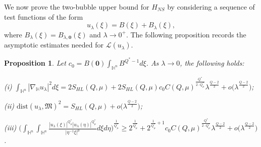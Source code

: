 \documentclass[11pt]{article}
\newtheorem{proposition}{Proposition}[section]
\begin{document}
{We now prove the two-bubble upper bound for $H_{NS}$ by considering a sequence of test}
functions of the form
\begin{equation*}
 u_\lambda(\xi)=B(\xi)+B_\lambda(\xi),
\end{equation*}
where $B_\lambda(\xi)=B_{\lambda,\mathbf{0}}(\xi)$ and $\lambda\rightarrow 0^+$. {The following proposition records the asymptotic estimates needed for $\mathcal{L}(u_\lambda)$.}
\begin{proposition}\label{p4.1}
Let $c_0=B(\mathbf{0})\int_{\mathbb{H}^{n}} B^{Q^{\ast}-1}d\xi$.
As $\lambda\rightarrow0$, the following holds:

(i) $\int_{\mathbb{H}^{n}}|\nabla_{\mathbb{H}} u_\lambda|^{2}{d}\xi=2S_{HL}(Q,\mu)+2S_{HL}(Q,\mu)
c_0C(Q,\mu)^{\frac{Q^{\ast}}{2\cdot Q^{\ast}_{\mu}}}\lambda^{\frac{Q-2}{2}}+o\big(\lambda^{\frac{Q-2}{2}}\big)$;

(ii) $\mathrm{dist}(u_\lambda,\mathfrak{M})^2=S_{HL}(Q,\mu)+o\big(\lambda^{\frac{Q-2}{2}}\big)$;

{(iii) $\Big(\int_{\mathbb{H}^{n}}\int_{\mathbb{H}^{n}}\frac{|u_\lambda(\xi)|^{Q^{\ast}_{\mu}}|u_\lambda(\eta)|
^{Q^{\ast}_{\mu}}}{|\eta^{-1}\xi|^{\mu}}{d}\xi{d}\eta\Big)^{\frac{1}{Q^{\ast}_{\mu}}}\geq2^{\frac{1}{Q^{\ast}_{\mu}}}+
2^{\frac{1}{Q^{\ast}_{\mu}}+1}c_0C(Q,\mu)^{\frac{Q^{\ast}}{2\cdot Q^{\ast}_{\mu}}}\lambda^{\frac{Q-2}{2}}+o\big(\lambda^{\frac{Q-2}{2}}\big)$.}
\end{proposition}
\end{document}

